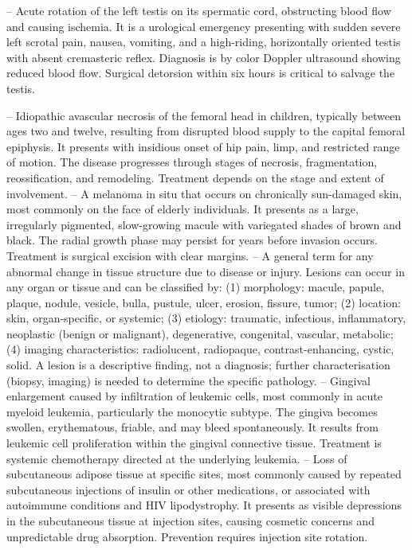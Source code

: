 -- Acute rotation of the left testis on its spermatic cord, obstructing blood flow and causing ischemia. It is a urological emergency presenting with sudden severe left scrotal pain, nausea, vomiting, and a high-riding, horizontally oriented testis with absent cremasteric reflex. Diagnosis is by color Doppler ultrasound showing reduced blood flow. Surgical detorsion within six hours is critical to salvage the testis.

-- Idiopathic avascular necrosis of the femoral head in children, typically between ages two and twelve, resulting from disrupted blood supply to the capital femoral epiphysis. It presents with insidious onset of hip pain, limp, and restricted range of motion. The disease progresses through stages of necrosis, fragmentation, reossification, and remodeling. Treatment depends on the stage and extent of involvement.
-- A melanoma in situ that occurs on chronically sun-damaged skin, most commonly on the face of elderly individuals. It presents as a large, irregularly pigmented, slow-growing macule with variegated shades of brown and black. The radial growth phase may persist for years before invasion occurs. Treatment is surgical excision with clear margins.
-- A general term for any abnormal change in tissue structure due to disease or injury. Lesions can occur in any organ or tissue and can be classified by: (1) morphology: macule, papule, plaque, nodule, vesicle, bulla, pustule, ulcer, erosion, fissure, tumor; (2) location: skin, organ-specific, or systemic; (3) etiology: traumatic, infectious, inflammatory, neoplastic (benign or malignant), degenerative, congenital, vascular, metabolic; (4) imaging characteristics: radiolucent, radiopaque, contrast-enhancing, cystic, solid. A lesion is a descriptive finding, not a diagnosis; further characterisation (biopsy, imaging) is needed to determine the specific pathology.
-- Gingival enlargement caused by infiltration of leukemic cells, most commonly in acute myeloid leukemia, particularly the monocytic subtype. The gingiva becomes swollen, erythematous, friable, and may bleed spontaneously. It results from leukemic cell proliferation within the gingival connective tissue. Treatment is systemic chemotherapy directed at the underlying leukemia.
-- Loss of subcutaneous adipose tissue at specific sites, most commonly caused by repeated subcutaneous injections of insulin or other medications, or associated with autoimmune conditions and HIV lipodystrophy. It presents as visible depressions in the subcutaneous tissue at injection sites, causing cosmetic concerns and unpredictable drug absorption. Prevention requires injection site rotation.
